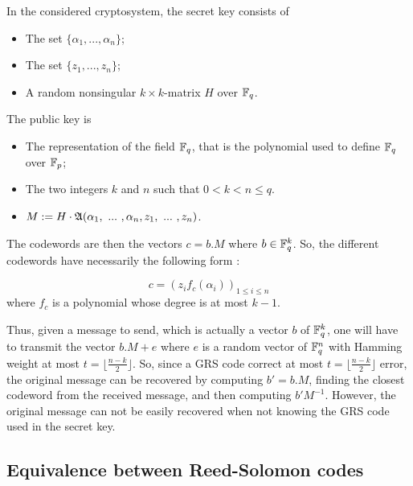 \documentclass[12pt,a4paper,titlepage]{article}
\begin{document}
\bigskip

In the considered cryptosystem, the secret key consists of
\begin{itemize}
\item The set $\{\alpha_1,... ,\alpha_n\}$;
\item The set $\{z_1,... ,z_n\}$;
\item A random nonsingular $k\times k$-matrix $H$ over $\mathbb{F}_q$.
\end{itemize}

The public key is
\begin{itemize}
\item The representation of the field $\mathbb{F}_q$, that is the polynomial used to define $\mathbb{F}_q$ over $\mathbb{F}_p$;
\item The two integers $k$ and $n$ such that $ 0 < k < n \leq q$.
\item $M := H \cdot \mathfrak{A}(\alpha_1, \ ... \ , \alpha_n, z_1, \ ... \ , z_n)$.
\end{itemize}

The codewords are then the vectors $c=b.M$ where $b\in\mathbb{F}_q^k$. So, the different codewords have necessarily the following form :

$$c=(z_if_c(\alpha_i))_{1\leq i\leq n}$$ where $f_c$ is a polynomial whose degree is at most $k-1$.


Thus, given a message to send, which is actually a vector $b$ of $\mathbb{F}_q^k$, one will have to transmit the vector $b.M + e$ where $e$ is a random vector of $\mathbb{F}_q^n$ with Hamming weight at most $t=\lfloor\frac{n-k}{2}\rfloor$.
So, since a GRS code correct at most $t=\lfloor\frac{n-k}{2}\rfloor$ error, the original message can be recovered by computing $b'=b.M$, finding the closest codeword from the received message, and then computing $b'M^{-1}$.
However, the original message can not be easily recovered when not knowing the GRS code used in the secret key.

\subsection{Equivalence between Reed-Solomon codes}
\end{document}
